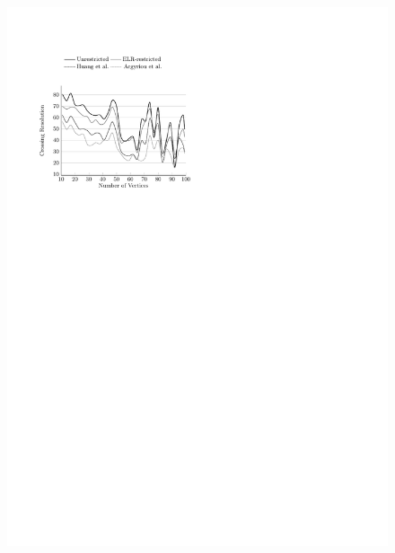 \documentclass{comjnl}
\begin{document}
\begin{figure}[t!]
{	\includegraphics[scale=0.99,page=6]{figures/north}}
	

\end{figure}
\end{document}
